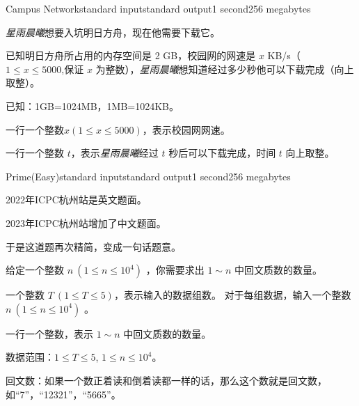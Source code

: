 \documentclass[12pt,a4paper,oneside]{article}
\begin{document}
    \begin{problem}{Campus Network}{standard input}{standard output}{1 second}{256 megabytes}
	
	\textit{星雨晨曦}想要入坑明日方舟，现在他需要下载它。
 
	已知明日方舟所占用的内存空间是 2 GB，校园网的网速是 $x$ KB/s（$1 \le x \le 5000$,保证 $x$ 为整数），\textit{星雨晨曦}想知道经过多少秒他可以下载完成（向上取整）。
	
        已知：1GB=1024MB，1MB=1024KB。

	
	\InputFile
	一行一个整数$x(1 \le x \le 5000)$，表示校园网网速。
	
	\OutputFile
	一行一个整数 $t$，表示\textit{星雨晨曦}经过 $t$ 秒后可以下载完成，时间 $t$ 向上取整。
	
	\Example
		
	\begin{example}
	\end{example}
	
	\end{problem}

    
    \begin{problem}{Prime(Easy)}{standard input}{standard output}{1 second}{256 megabytes}
	
	

    2022年ICPC杭州站是英文题面。
    
    2023年ICPC杭州站增加了中文题面。
    
    于是这道题再次精简，变成一句话题意。

    

    给定一个整数 $n \ (1 \leq n \leq 10^4)$ ，你需要求出 $1 \sim n$ 中回文质数的数量。

	
	
	\InputFile
	
	一个整数 $T\ (1\leq T \leq 5)$，表示输入的数据组数。
        对于每组数据，输入一个整数 $n \ (1 \leq n \leq 10^4)$ 。

	
	\OutputFile
	
	一行一个整数，表示 $1 \sim n$ 中回文质数的数量。
	
	\Example
 
	\begin{example}
	\exmpfile{D/1.in}{D/1.ans}%
	\end{example}
	\Note
    数据范围：$1\leq T \leq 5$, $1 \leq n \leq 10^4$。
    
    回文数：如果一个数正着读和倒着读都一样的话，那么这个数就是回文数，如“7”，“12321”，“5665”。
	\end{problem}
\end{document}
